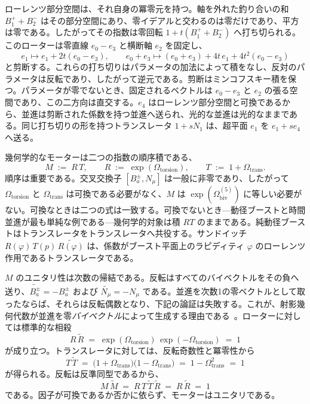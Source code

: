 \documentclass[a4paper]{article}
\begin{document}
ローレンツ部分空間は、それ自身の冪零元を持つ。軸を外れた釣り合いの和 \(B^{+}_{1}+B^{-}_{2}\) はその部分空間にあり、零イデアルと交わるのは零だけであり、平方は零である。したがってその指数は零回転 \(1+t(B^{+}_{1}+B^{-}_{2})\) へ打ち切られる。このローターは零直線 \(e_{0}-e_{3}\) と横断軸 \(e_{2}\) を固定し、
\[
e_{1}\mapsto e_{1}+2t(e_{0}-e_{3}),
\qquad
e_{0}+e_{3}\mapsto (e_{0}+e_{3})+4t\,e_{1}+4t^{2}(e_{0}-e_{3})
\]
と剪断する。これらの打ち切りはパラメータの加法によって積をなし、反対のパラメータは反転であり、したがって逆元である。剪断はミンコフスキー積を保つ。パラメータが零でないとき、固定されるベクトルは \(e_{0}-e_{3}\) と \(e_{2}\) の張る空間であり、この二方向は直交する。\(e_{4}\) はローレンツ部分空間と可換であるから、並進は剪断された係数を持つ並進へ送られ、光的な並進は光的なままである。同じ打ち切りの形を持つトランスレータ \(1+s N_{1}\) は、超平面 \(e_{1}\) を \(e_{1}+s e_{4}\) へ送る。

幾何学的なモーターは二つの指数の順序積である、
\[
M \;:=\; R\,T,
\qquad
R \;:=\; \exp(\Omega_{\mathrm{torsion}}),\qquad
T \;:=\; 1+\Omega_{\mathrm{trans}}.
\]
順序は重要である。交叉交換子 \([B_{a}^{\pm},N_{\mu}]\) は一般に非零であり、したがって \(\Omega_{\mathrm{torsion}}\) と \(\Omega_{\mathrm{trans}}\) は可換である必要がなく、\(M\) は \(\exp(\Omega_{\mathrm{biv}}^{(5)})\) に等しい必要がない。可換なときは二つの式は一致する。可換でないとき---動径ブーストと時間並進が最も単純な例である---幾何学的対象は積 \(RT\) のままである。純動径ブーストはトランスレータをトランスレータへ共役する。サンドイッチ \(R(\varphi)\,T(p)\,\widetilde{R(\varphi)}\) は、係数がブースト平面上のラピディティ \(\varphi\) のローレンツ作用であるトランスレータである。

\(M\) のユニタリ性は次数の帰結である。反転はすべてのバイベクトルをその負へ送り、\(\widetilde{B_{a}^{\pm}}=-B_{a}^{\pm}\) および \(\widetilde{N_{\mu}}=-N_{\mu}\) である。並進を次数1の零ベクトルとして取ったならば、それらは反転偶数となり、下記の論証は失敗する。これが、射影幾何代数が並進を零\emph{バイベクトル}によって生成する理由である~\cite{Gunn2017,Lengyel2024,GunnDeKeninck2019}。ローターに対しては標準的な相殺
\[
R\,\widetilde{R}
\;=\;
\exp(\Omega_{\mathrm{torsion}})\,\exp(-\Omega_{\mathrm{torsion}})
\;=\; 1
\]
が成り立つ。トランスレータに対しては、反転奇数性と冪零性から
\[
T\,\widetilde{T}
\;=\;
\bigl(1+\Omega_{\mathrm{trans}}\bigr)\bigl(1-\Omega_{\mathrm{trans}}\bigr)
\;=\;
1-\Omega_{\mathrm{trans}}^{2}
\;=\; 1
\]
が得られる。反転は反準同型であるから、
\[
M\,\widetilde{M}
\;=\;
R\,T\,\widetilde{T}\,\widetilde{R}
\;=\;
R\,\widetilde{R}
\;=\; 1
\]
である。因子が可換であるか否かに依らず、モーターはユニタリである。
\end{document}
